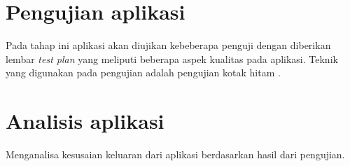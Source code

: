 \section{Pengujian aplikasi}

Pada tahap ini aplikasi akan diujikan kebeberapa penguji dengan diberikan lembar \textit{test plan} yang meliputi beberapa aspek kualitas pada aplikasi. Teknik yang digunakan pada pengujian adalah pengujian kotak hitam \cite{TEST1}.

\section{Analisis aplikasi}

Menganalisa kesusaian keluaran dari aplikasi berdasarkan hasil dari pengujian.